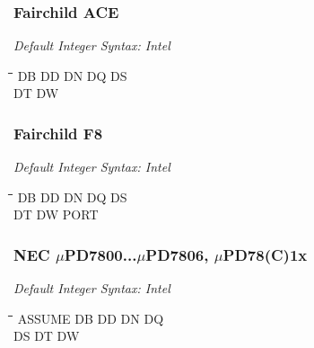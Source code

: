 \subsubsection{Fairchild ACE}

{\em Default Integer Syntax: Intel}

{\tt\begin{tabbing}
\hspace{3cm}\=\hspace{3cm}\=\hspace{3cm}\=\hspace{3cm}\=\kill
DB          \> DD          \> DN         \> DQ          \> DS \\
DT          \> DW \\
\end{tabbing}}

\subsubsection{Fairchild F8}

{\em Default Integer Syntax: Intel}

{\tt\begin{tabbing}
\hspace{3cm}\=\hspace{3cm}\=\hspace{3cm}\=\hspace{3cm}\=\kill
DB          \> DD          \> DN         \> DQ          \> DS \\
DT          \> DW          \> PORT \\
\end{tabbing}}

\subsubsection{NEC $\mu$PD7800...$\mu$PD7806, $\mu$PD78(C)1x}

{\em Default Integer Syntax: Intel}

{\tt\begin{tabbing}
\hspace{3cm}\=\hspace{3cm}\=\hspace{3cm}\=\hspace{3cm}\=\kill
ASSUME     \> DB          \> DD          \> DN          \> DQ \\
DS         \> DT          \> DW \\
\end{tabbing}}


